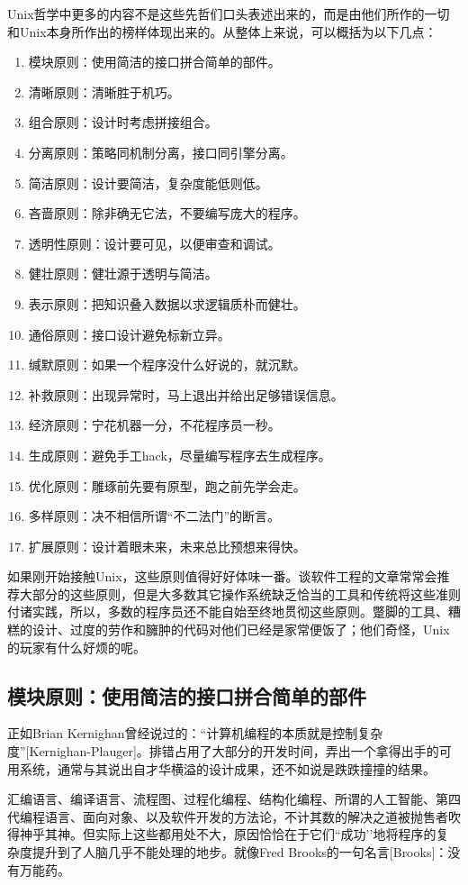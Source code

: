 \documentclass[12pt,oneside]{book}
\begin{document}
\begin{common-format}
Unix哲学中更多的内容不是这些先哲们口头表述出来的，而是由他们所作的一切和Unix本身所作出的榜样体现出来的。从整体上来说，可以概括为以下几点：
\begin{enumerate}
\item 模块原则：使用简洁的接口拼合简单的部件。
\item 清晰原则：清晰胜于机巧。
\item 组合原则：设计时考虑拼接组合。
\item 分离原则：策略同机制分离，接口同引擎分离。
\item 简洁原则：设计要简洁，复杂度能低则低。
\item 吝啬原则：除非确无它法，不要编写庞大的程序。
\item 透明性原则：设计要可见，以便审查和调试。
\item 健壮原则：健壮源于透明与简洁。
\item 表示原则：把知识叠入数据以求逻辑质朴而健壮。
\item 通俗原则：接口设计避免标新立异。
\item 缄默原则：如果一个程序没什么好说的，就沉默。
\item 补救原则：出现异常时，马上退出并给出足够错误信息。
\item 经济原则：宁花机器一分，不花程序员一秒。
\item 生成原则：避免手工hack，尽量编写程序去生成程序。
\item 优化原则：雕琢前先要有原型，跑之前先学会走。
\item 多样原则：决不相信所谓“不二法门”的断言。
\item 扩展原则：设计着眼未来，未来总比预想来得快。
\end{enumerate}

如果刚开始接触Unix，这些原则值得好好体味一番。谈软件工程的文章常常会推荐大部分的这些原则，但是大多数其它操作系统缺乏恰当的工具和传统将这些准则付诸实践，所以，多数的程序员还不能自始至终地贯彻这些原则。蹩脚的工具、糟糕的设计、过度的劳作和臃肿的代码对他们已经是家常便饭了；他们奇怪，Unix的玩家有什么好烦的呢。


\subsection{模块原则：使用简洁的接口拼合简单的部件}
正如Brian Kernighan曾经说过的：“计算机编程的本质就是控制复杂度”[Kernighan-Plauger]。排错占用了大部分的开发时间，弄出一个拿得出手的可用系统，通常与其说出自才华横溢的设计成果，还不如说是跌跌撞撞的结果。

汇编语言、编译语言、流程图、过程化编程、结构化编程、所谓的人工智能、第四代编程语言、面向对象、以及软件开发的方法论，不计其数的解决之道被抛售者吹得神乎其神。但实际上这些都用处不大，原因恰恰在于它们“成功’’地将程序的复杂度提升到了人脑几乎不能处理的地步。就像Fred Brooks的一句名言[Brooks]：没有万能药。


\end{common-format}
\end{document}
